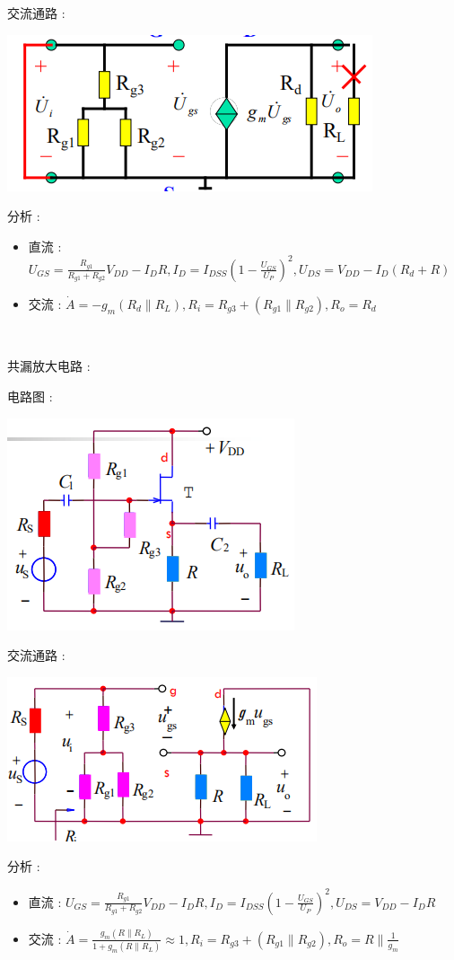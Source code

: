 \documentclass[UTF8, 12pt]{ctexart}
\begin{document}
	交流通路 :

	\includegraphics[scale = 0.4]{02/共源放大电路交流通路.png}

	分析 :
	\begin{itemize}[leftmargin = 4em]
		\item 直流 : $ U_{GS} = \frac{R_{g1}}{R_{g1}+R_{g2}}V_{DD} - I_{D}R, I_{D} = I_{DSS}(1-\frac{U_{GS}}{U_{P}})^{2}, U_{DS} = V_{DD} - I_{D}(R_{d}+R) $
		\item 交流 : $ \dot{A} = -g_{m}(R_{d} \parallel R_{L}), R_{i} = R_{g3} + (R_{g1} \parallel R_{g2}), R_{o} = R_{d} $
	\end{itemize}

	~

	\noindent
	共漏放大电路 :

	电路图 :

	\includegraphics[scale = 0.4]{02/共漏放大电路电路图.png}

	交流通路 :

	\includegraphics[scale = 0.4]{02/共漏放大电路交流通路.png}

	分析 :
	\begin{itemize}[leftmargin = 4em]
		\item 直流 : $ U_{GS} = \frac{R_{g1}}{R_{g1}+R_{g2}}V_{DD} - I_{D}R, I_{D} = I_{DSS}(1-\frac{U_{GS}}{U_{P}})^{2}, U_{DS} = V_{DD} - I_{D}R $
		\item 交流 : $ \dot{A} = \frac{g_{m}(R \parallel R_{L})}{1+g_{m}(R \parallel R_{L})} \approx 1, R_{i} = R_{g3} + (R_{g1} \parallel R_{g2}), R_{o} = R \parallel \frac{1}{g_{m}} $
	\end{itemize}
\end{document}
